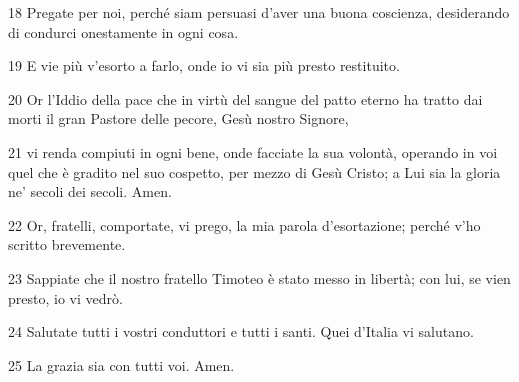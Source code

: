 \par 18 Pregate per noi, perché siam persuasi d'aver una buona coscienza, desiderando di condurci onestamente in ogni cosa.
\par 19 E vie più v'esorto a farlo, onde io vi sia più presto restituito.
\par 20 Or l'Iddio della pace che in virtù del sangue del patto eterno ha tratto dai morti il gran Pastore delle pecore, Gesù nostro Signore,
\par 21 vi renda compiuti in ogni bene, onde facciate la sua volontà, operando in voi quel che è gradito nel suo cospetto, per mezzo di Gesù Cristo; a Lui sia la gloria ne' secoli dei secoli. Amen.
\par 22 Or, fratelli, comportate, vi prego, la mia parola d'esortazione; perché v'ho scritto brevemente.
\par 23 Sappiate che il nostro fratello Timoteo è stato messo in libertà; con lui, se vien presto, io vi vedrò.
\par 24 Salutate tutti i vostri conduttori e tutti i santi. Quei d'Italia vi salutano.
\par 25 La grazia sia con tutti voi. Amen.


